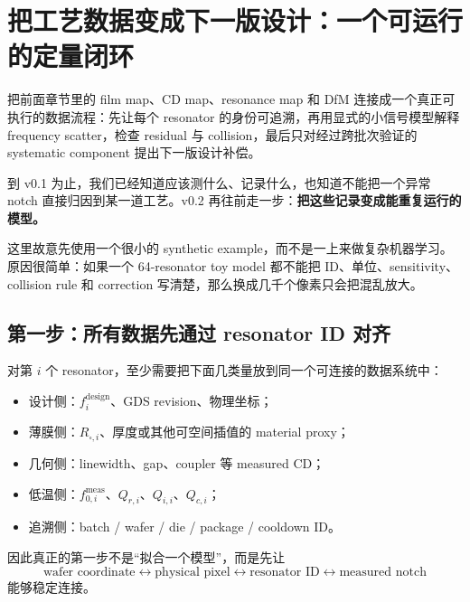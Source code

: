 \chapter{把工艺数据变成下一版设计：一个可运行的定量闭环}

\begin{chaptergoal}
把前面章节里的 film map、CD map、resonance map 和 DfM 连接成一个真正可执行的数据流程：先让每个 resonator 的身份可追溯，再用显式的小信号模型解释 frequency scatter，检查 residual 与 collision，最后只对经过跨批次验证的 systematic component 提出下一版设计补偿。
\end{chaptergoal}

到 v0.1 为止，我们已经知道应该测什么、记录什么，也知道不能把一个异常 notch 直接归因到某一道工艺。v0.2 再往前走一步：\textbf{把这些记录变成能重复运行的模型。}

这里故意先使用一个很小的 synthetic example，而不是一上来做复杂机器学习。原因很简单：如果一个 64-resonator toy model 都不能把 ID、单位、sensitivity、collision rule 和 correction 写清楚，那么换成几千个像素只会把混乱放大。


\section{第一步：所有数据先通过 resonator ID 对齐}

对第 $i$ 个 resonator，至少需要把下面几类量放到同一个可连接的数据系统中：

\begin{itemize}
  \item 设计侧：$f_i^{\mathrm{design}}$、GDS revision、物理坐标；
  \item 薄膜侧：$R_{\square,i}$、厚度或其他可空间插值的 material proxy；
  \item 几何侧：linewidth、gap、coupler 等 measured CD；
  \item 低温侧：$f_{0,i}^{\mathrm{meas}}$、$Q_{r,i}$、$Q_{i,i}$、$Q_{c,i}$；
  \item 追溯侧：batch / wafer / die / package / cooldown ID。
\end{itemize}

因此真正的第一步不是“拟合一个模型”，而是先让
\[
\text{wafer coordinate}
\leftrightarrow
\text{physical pixel}
\leftrightarrow
\text{resonator ID}
\leftrightarrow
\text{measured notch}
\]
能够稳定连接。

